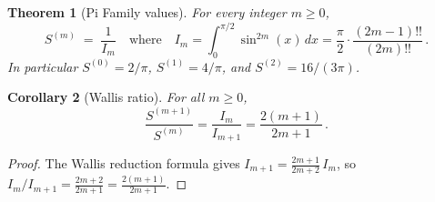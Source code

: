 \documentclass[11pt]{article}
\newcommand{\dff}[1]{(#1)!!}
\newtheorem{theorem}{Theorem}[section]
\newtheorem{corollary}[theorem]{Corollary}
\theoremstyle{remark}
\begin{document}
\begin{theorem}[Pi Family values]\label{thm:wallis}
For every integer $m \geq 0$,
\begin{equation}\label{eq:valm}
  S^{(m)} \;=\; \frac{1}{I_m}
  \quad\text{where}\quad
  I_m = \int_0^{\pi/2}\!\sin^{2m}(x)\,dx
      = \frac{\pi}{2}\cdot\frac{\dff{2m{-}1}}{(2m)!!}\,.
\end{equation}
In particular $S^{(0)} = 2/\pi$, $S^{(1)} = 4/\pi$, and
$S^{(2)} = 16/(3\pi)$.
\end{theorem}

\begin{corollary}[Wallis ratio]\label{cor:wallis}
For all $m \geq 0$,
\[
  \frac{S^{(m+1)}}{S^{(m)}}
  = \frac{I_m}{I_{m+1}}
  = \frac{2(m{+}1)}{2m{+}1}\,.
\]
\end{corollary}

\begin{proof}
The Wallis reduction formula gives
$I_{m+1} = \frac{2m{+}1}{2m{+}2}\,I_m$, so
$I_m/I_{m+1} = \frac{2m{+}2}{2m{+}1} = \frac{2(m{+}1)}{2m{+}1}$.
\end{proof}
\end{document}
